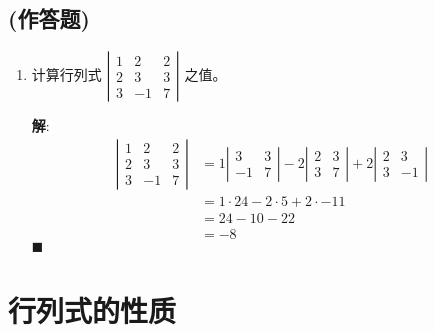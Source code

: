 \documentclass{report}
\newcommand{\sol}{\vspace{0.2cm}\textbf{解}:}
\begin{document}
\subsection*{(作答题)}
\begin{enumerate}
  \item 计算行列式 $\left|\begin{array}{rrr}1 & 2 & 2 \\ 2 & 3 & 3 \\ 3 & -1 & 7\end{array}\right|$ 之值。

        \sol{}
        \begin{align*}
          \left|\begin{array}{rrr}1 & 2 & 2 \\ 2 & 3 & 3 \\ 3 & -1 & 7\end{array}\right| & = 1 \left|\begin{array}{rr}3 & 3 \\ -1 & 7\end{array}\right| - 2 \left|\begin{array}{rr}2 & 3 \\ 3 & 7\end{array}\right| + 2 \left|\begin{array}{rr}2 & 3 \\ 3 & -1\end{array}\right| \\
                                                                                         & = 1 \cdot 24 - 2 \cdot 5 + 2 \cdot -11                                                                                                                                                \\
                                                                                         & = 24 - 10 - 22                                                                                                                                                                        \\
                                                                                         & = -8
        \end{align*} \hfill$\blacksquare$
\end{enumerate}

\section{行列式的性质}
\end{document}
